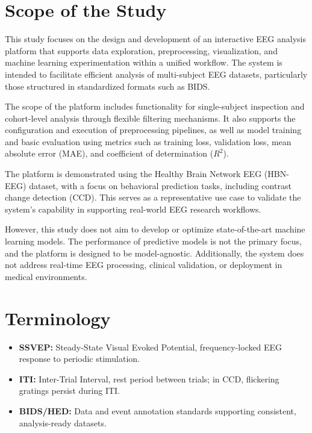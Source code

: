 \section{Scope of the Study}
\label{sec:scope}

This study focuses on the design and development of an interactive EEG analysis platform that supports data exploration, preprocessing, visualization, and machine learning experimentation within a unified workflow. The system is intended to facilitate efficient analysis of multi-subject EEG datasets, particularly those structured in standardized formats such as BIDS.
\vspace{0.5em}

The scope of the platform includes functionality for single-subject inspection and cohort-level analysis through flexible filtering mechanisms. It also supports the configuration and execution of preprocessing pipelines, as well as model training and basic evaluation using metrics such as training loss, validation loss, mean absolute error (MAE), and coefficient of determination ($R^2$).
\vspace{0.5em}

The platform is demonstrated using the Healthy Brain Network EEG (HBN-EEG) dataset, with a focus on behavioral prediction tasks, including contrast change detection (CCD). This serves as a representative use case to validate the system’s capability in supporting real-world EEG research workflows.
\vspace{0.5em}

However, this study does not aim to develop or optimize state-of-the-art machine learning models. The performance of predictive models is not the primary focus, and the platform is designed to be model-agnostic. Additionally, the system does not address real-time EEG processing, clinical validation, or deployment in medical environments.


\section{Terminology}
\label{sec:terminology}

\begin{itemize}
    \item \textbf{SSVEP:} Steady-State Visual Evoked Potential, frequency-locked EEG response to periodic stimulation.
    \item \textbf{ITI:} Inter-Trial Interval, rest period between trials; in CCD, flickering gratings persist during ITI.
    \item \textbf{BIDS/HED:} Data and event annotation standards supporting consistent, analysis-ready datasets.
\end{itemize}

